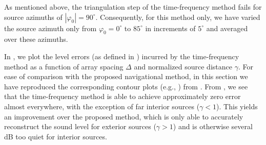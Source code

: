 As mentioned above, the triangulation step of the time-frequency method fails for source azimuths of $|\varphi_0| = 90^\circ$.
Consequently, for this method only, we have varied the source azimuth only from $\varphi_0 = 0^\circ$ to $85^\circ$ in increments of $5^\circ$ and averaged over these azimuths.


In , we plot the level errors (as defined in ) incurred by the time-frequency method as a function of array spacing $\Delta$ and normalized source distance $\gamma$.
For ease of comparison with the proposed navigational method, in this section we have reproduced the corresponding contour plots (e.g., ) from .
From , we see that the time-frequency method is able to achieve approximately zero error almost everywhere, with the exception of far interior sources ($\gamma < 1$).
This yields an improvement over the proposed method, which is only able to accurately reconstruct the sound level for exterior sources ($\gamma > 1$) and is otherwise several dB too quiet for interior sources.

